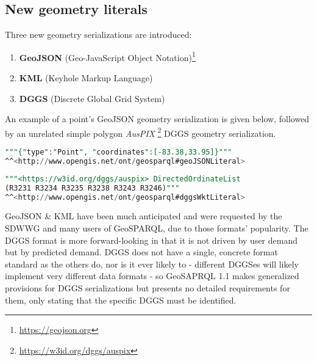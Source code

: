 \documentclass[runningheads]{llncs}
\begin{document}
\subsection{New geometry literals}\label{sec:newliterals}
Three new geometry serializations are introduced: 

\begin{enumerate}
    \item \textbf{GeoJSON} (Geo-JavaScript Object Notation)\footnote{\url{https://geojson.org}}%
    \item \textbf{KML} (Keyhole Markup Language)%
    \item \textbf{DGGS} (Discrete Global Grid System)~\cite{sahr1998discrete}
\end{enumerate} 

An example of a point's GeoJSON geometry serialization is given below, followed by an unrelated simple polygon \textit{AusPIX}
\footnote{\url{https://w3id.org/dggs/auspix}} DGGS geometry serialization.

\small
\begin{lstlisting}[caption=GeoJSON geometry serialization example,label=lst:geojsonliteral,language=sql,frame=single,basicstyle=\ttfamily,showstringspaces=false]
"""{"type":"Point", "coordinates":[-83.38,33.95]}"""
^^<http://www.opengis.net/ont/geosparql#geoJSONLiteral>
\end{lstlisting}

\begin{lstlisting}[caption=AusPIX DGGS geometry serialization example,label=lst:geodggsWktliteral,language=sql,frame=single,basicstyle=\ttfamily,showstringspaces=false]
"""<https://w3id.org/dggs/auspix> DirectedOrdinateList 
(R3231 R3234 R3235 R3238 R3243 R3246)"""
^^<http://www.opengis.net/ont/geosparql#dggsWktLiteral>
\end{lstlisting}
\normalsize

GeoJSON \& KML have been much anticipated and were requested by the SDWWG and many users of 
GeoSPARQL, due to those formats' popularity. The DGGS format is more forward-looking in that it is not driven by user demand but by predicted demand.
DGGS does not have a single, concrete format standard as the others do, nor is it ever likely to - different DGGSes will 
likely implement very different data formats - so GeoSAPRQL 1.1 makes generalized provisions for DGGS serializations but 
presents no detailed requirements for them, only stating that the specific DGGS must be identified.
\end{document}

